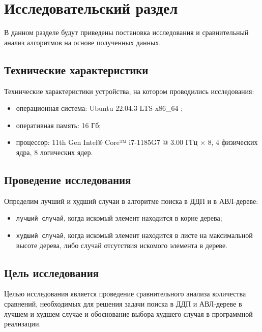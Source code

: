 \chapter{Исследовательский раздел}

В данном разделе будут приведены постановка исследования и сравнительный анализ алгоритмов на основе полученных данных.

\section{Технические характеристики}

Технические характеристики устройства, на котором проводились исследования: 

\begin{itemize}[label=--]
	\item операционная система: Ubuntu 22.04.3 LTS x86\_64 \cite{info_os};
	\item оперативная память: 16 Гб;
	\item процессор: 11th Gen Intel® Core™ i7-1185G7 @ 3.00 ГГц × 8, 4 физических ядра, 8 логических ядер.
\end{itemize}	

\section{Проведение исследования}

Определим лучший и худший случаи в алгоритме поиска в ДДП и в АВЛ-дереве:

\begin{itemize}[label*=--]
	\item \texttt{лучший случай}, когда искомый элемент находится в корне дерева;
	\item \texttt{худший случай}, когда искомый элемент находится в листе на максимальной высоте дерева, либо случай отсутствия искомого элемента в дереве.
\end{itemize}

\section*{Цель исследования}

Целью исследования является проведение сравнительного анализа количества сравнений, необходимых для решения задачи поиска в ДДП и АВЛ-дереве в лучшем и худшем случае и обоснование выбора худшего случая в программной реализации.

\clearpage 

